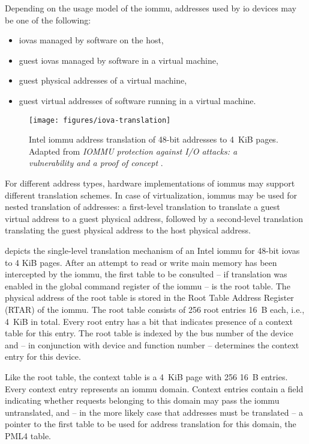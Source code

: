Depending on the usage model of the \ac{iommu}, addresses used by \ac{io}
devices may be one of the following:

\begin{itemize}
    \item \acp{iova} managed by software on the host,
    \item guest \acp{iova} managed by software in a virtual machine,
    \item guest physical addresses of a virtual machine,
    \item guest virtual addresses of software running in a virtual machine.
\end{itemize}

\begin{figure}[!b]
    \centering
    \texttt{[image: figures/iova-translation]}
    \caption{Intel \acs{iommu} address translation of 48-bit addresses to 4~KiB
    pages. Adapted from \textit{IOMMU protection against I/O attacks: a
    vulnerability and a proof of concept} \cite{morgan2018iommu}.}
    \label{fig:translation}
\end{figure}

For different address types, hardware implementations of \acp{iommu} may support
different translation schemes. In case of virtualization, \acp{iommu} may be
used for nested translation of addresses: a first-level translation to translate
a guest virtual address to a guest physical address, followed by a second-level
translation translating the guest physical address to the host physical address.

 depicts the single-level translation mechanism of an
Intel \ac{iommu} for 48-bit \acp{iova} to 4 KiB pages. After an attempt to read
or write main memory has been intercepted by the \ac{iommu}, the first table to
be consulted -- if translation was enabled in the global command register of the
\ac{iommu} -- is the root table. The physical address of the root table is
stored in the Root Table Address Register (RTAR) of the \ac{iommu}. The root
table consists of 256 root entries 16~B each, i.e., 4~KiB in total. Every root
entry has a bit that indicates presence of a context table for this entry. The
root table is indexed by the bus number of the device and -- in conjunction with
device and function number -- determines the context entry for this device.

Like the root table, the context table is a 4~KiB page with 256 16~B entries.
Every context entry represents an \ac{iommu} domain. Context entries contain a
field indicating whether requests belonging to this domain may pass the
\ac{iommu} untranslated, and -- in the more likely case that addresses must be
translated -- a pointer to the first table to be used for address translation
for this domain, the PML4 table.

